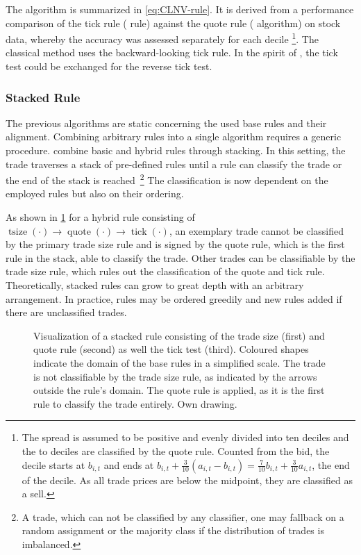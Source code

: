 The algorithm is summarized in \cref{eq:CLNV-rule}. It is derived from a performance comparison of the tick rule ( rule) against the quote rule ( algorithm) on stock data, whereby the accuracy was assessed separately for each decile \footnote{The spread is assumed to be positive and evenly divided into ten deciles and the  to  deciles are classified by the quote rule. Counted from the bid, the  decile starts at $b_{i,t}$ and ends at $b_{i,t} + \tfrac{3}{10} (a_{i,t} - b_{i,t}) = \tfrac{7}{10} b_{i,t} + \tfrac{3}{10} a_{i,t}$, the end of the  decile. As all trade prices are below the midpoint, they are classified as a sell.}. The classical  method uses the backward-looking tick rule. In the spirit of \textcite[][735]{leeInferringTradeDirection1991}, the tick test could be exchanged for the reverse tick test.

\subsubsection{Stacked Rule}\label{sec:stacked-rule}

The previous algorithms are static concerning the used base rules and their alignment. Combining arbitrary rules into a single algorithm requires a generic procedure. \textcite[][18]{grauerOptionTradeClassification2022} combine basic and hybrid rules through stacking. In this setting, the trade traverses a stack of pre-defined rules until a rule can classify the trade or the end of the stack is reached~\footnote{A trade, which can not be classified by any classifier, one may fallback on a random assignment or the majority class if the distribution of trades is imbalanced.}  The classification is now dependent on the employed rules but also on their ordering.

As shown in \cref{fig:stacking-algo} for a hybrid rule consisting of $\operatorname{tsize}(\cdot) \to \operatorname{quote}(\cdot) \to \operatorname{tick}(\cdot)$, an exemplary trade cannot be classified by the primary trade size rule and is signed by the quote rule, which is the first rule in the stack, able to classify the trade. Other trades can be classifiable by the trade size rule, which rules out the classification of the quote and tick rule. Theoretically, stacked rules can grow to great depth with an arbitrary arrangement. In practice, rules may be ordered greedily and new rules added if there are unclassified trades.

\begin{figure}[ht!]
\begin{center}
  
\end{center}
\caption[Visualization Of A Stacked Rules]{Visualization of a stacked rule consisting of the trade size (first) and quote rule (second) as well the tick test (third). Coloured shapes indicate the domain of the base rules in a simplified scale. The trade is not classifiable by the trade size rule, as indicated by the arrows outside the rule's domain. The quote rule is applied, as it is the first rule to classify the trade entirely. Own drawing.}
\label{fig:stacking-algo}
\end{figure}

